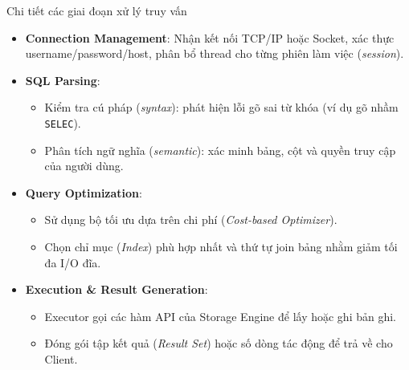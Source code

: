 \documentclass[aspectratio=169,11pt]{beamer}
\newcommand{\kw}[1]{\textcolor{dbblue}{\textbf{#1}}}
\begin{document}
\begin{frame}{Chi tiết các giai đoạn xử lý truy vấn}
\begin{itemize}\setlength{\itemsep}{3pt}
  \item \kw{Connection Management}: Nhận kết nối TCP/IP hoặc Socket, xác thực username/password/host, phân bổ thread cho từng phiên làm việc (\textit{session}).
  \item \kw{SQL Parsing}:
    \begin{itemize}\footnotesize
      \item Kiểm tra cú pháp (\textit{syntax}): phát hiện lỗi gõ sai từ khóa (ví dụ gõ nhầm \texttt{SELEC}).
      \item Phân tích ngữ nghĩa (\textit{semantic}): xác minh bảng, cột và quyền truy cập của người dùng.
    \end{itemize}
  \item \kw{Query Optimization}:
    \begin{itemize}\footnotesize
      \item Sử dụng bộ tối ưu dựa trên chi phí (\textit{Cost-based Optimizer}).
      \item Chọn chỉ mục (\textit{Index}) phù hợp nhất và thứ tự join bảng nhằm giảm tối đa I/O đĩa.
    \end{itemize}
  \item \kw{Execution \& Result Generation}:
    \begin{itemize}\footnotesize
      \item Executor gọi các hàm API của Storage Engine để lấy hoặc ghi bản ghi.
      \item Đóng gói tập kết quả (\textit{Result Set}) hoặc số dòng tác động để trả về cho Client.
    \end{itemize}
\end{itemize}
\end{frame}
\end{document}
